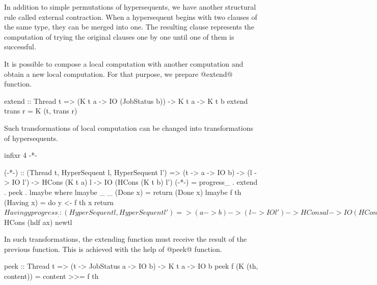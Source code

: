 \documentclass[doctor]{iscs-thesis}
\begin{document}
In addition to simple permutations of hypersequents, we have another
structural rule called external contraction.  When a hypersequent begins
with two clauses of the same type, they can be merged into one.  The
resulting clause represents the computation of trying the original
clauses one by one until one of them is successful.

It is possible to compose a local computation with another computation
and obtain a new local computation.
For that purpose, we prepare @extend@ function.
\begin{code}
extend :: Thread t =>
  (K t a -> IO (JobStatus b)) -> K t a -> K t b
extend trans r = K (t, trans r)
\end{code}

Such transformations of local computation can be changed into
transformations of hypersequents.
\begin{code}
infixr 4 -*-

(-*-) :: (Thread t, HyperSequent l, HyperSequent l') =>
            (t -> a -> IO b) -> (l -> IO l') ->
            HCons (K t a) l -> IO (HCons (K t b) l')
(-*-) = progress_ . extend . peek . lmaybe
  where
    lmaybe _ _  (Done x) = return (Done x)
    lmaybe f th (Having x) =  do
      y <- f th x
      return $ Having y

progress_ :: (HyperSequent l, HyperSequent l') =>
            (a -> b) -> (l -> IO l') -> HCons a l -> 
            IO (HCons b l')
progress_ hdf tlf (HCons ax bl) = do
  newtl <- tlf bl
  return $ HCons (hdf ax) newtl
\end{code}

In such transformations,
the extending function must receive the result of the previous function.
This is achieved with the help of @peek@ function.
\begin{code}
peek :: Thread t =>
  (t -> JobStatus a -> IO b) -> K t a -> IO b 
peek f (K (th, content)) = content >>= f th 
\end{code}
\end{document}
